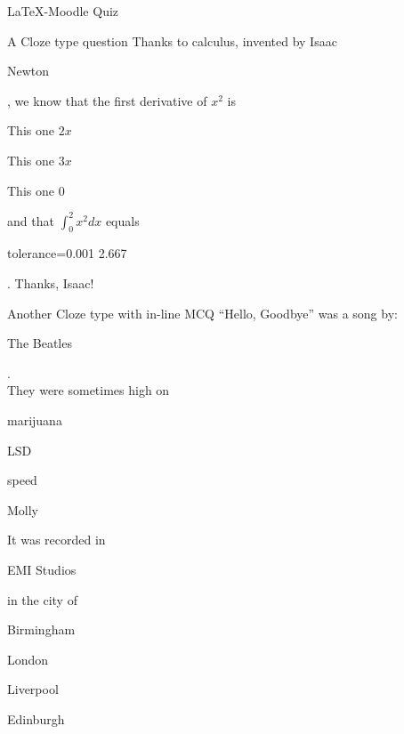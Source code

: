 \documentclass{article}
\begin{document}
\begin{quiz}{LaTeX-Moodle Quiz}
    
    \begin{cloze}{A Cloze type question}
        Thanks to calculus, invented by Isaac
        \begin{shortanswer}[usecase]
            \item Newton
        \end{shortanswer},
        we know that the first derivative of $x^2$ is
        \begin{multi}[horizontal]
            \item* This one $2x$
            \item This one $3x$
            \item This one $0$
        \end{multi}
        and that $\int_0^2 x^2 dx$ equals
        \begin{numerical}
            \item[tolerance={0.001}] 2.667
        \end{numerical}.
        Thanks, Isaac!
    \end{cloze}

    \begin{cloze}{Another Cloze type with in-line MCQ}
        ``Hello, Goodbye'' was a song by:
        \begin{shortanswer}[usecase]
            \item The Beatles
        \end{shortanswer}.
        \\
        They were sometimes high on
        \begin{multi}[horizontal]
            \item marijuana
            \item* LSD
            \item speed
            \item Molly
        \end{multi}
        It was recorded in
        \begin{shortanswer}[usecase]
            \item EMI Studios
        \end{shortanswer}
        in the city of
        \begin{multi}[vertical]
            \item Birmingham
            \item* London
            \item Liverpool
            \item Edinburgh
        \end{multi}
    \end{cloze}


\end{quiz}
\end{document}
